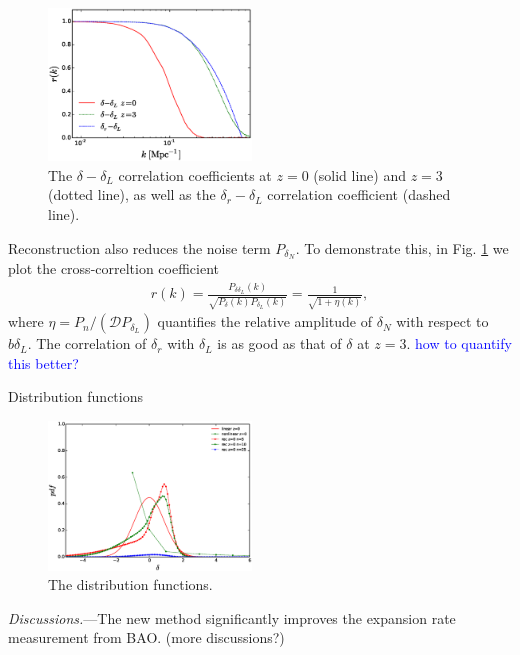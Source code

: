 \documentclass[aps,prd,twocolumn,showpacs,superscriptaddress,groupedaddress,nofootinbib]{revtex4}  %
\newcommand{\tcb}{\textcolor{blue}}
\newcommand{\bea}{\begin{eqnarray}}
\newcommand{\eea}{\end{eqnarray}}
\begin{document}
\begin{figure}[tbp]
\begin{center}
\includegraphics[width=0.48\textwidth]{f7x.eps}
\end{center}
\vspace{-0.7cm}
\caption{The $\delta-\delta_L$ correlation coefficients at $z=0$ (solid
line) and $z=3$ (dotted line), as well as the $\delta_r-\delta_L$ 
correlation coefficient (dashed line).}
\label{fig:xcc}
\end{figure}

Reconstruction also reduces the noise term $P_{\delta_N}$. To demonstrate this,
in Fig. \ref{fig:xcc} we plot the  cross-correltion coefficient 
\bea
r(k)=\frac{P_{\delta\delta_L}(k)}
{\sqrt{P_{\delta}(k)P_{\delta_L}(k)}}
=\frac{1}{\sqrt{1+\eta(k)}},
\eea
where $\eta=P_n/(\mathcal{D}P_{\delta_L})$ quantifies the relative amplitude
of $\delta_N$ with respect to $b\delta_L$. The correlation of $\delta_r$ with
$\delta_L$ is as good as that of $\delta$ at $z=3$.
\tcb{how to quantify this better?}

Distribution functions 
\begin{figure}[tbp]
\begin{center}
\includegraphics[width=0.48\textwidth]{f9.eps}
\end{center}
\vspace{-0.7cm}
\caption{The distribution functions.}
\label{fig:pdf}
\end{figure}




{\it Discussions.}---The new method significantly
improves the expansion rate measurement from BAO. (more discussions?) 
\end{document}
